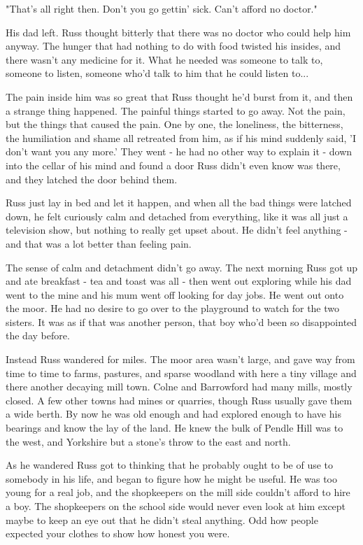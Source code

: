 \documentclass[a4paper,11pt]{article}
\begin{document}
"That's all right then. Don't you go gettin' sick. Can't afford no doctor."

His dad left. Russ thought bitterly that there was no doctor who could help him anyway. The hunger that had nothing to do with food twisted his insides, and there wasn't any medicine for it. What he needed was someone to talk to, someone to listen, someone who'd talk to him that he could listen to...

The pain inside him was so great that Russ thought he'd burst from it, and then a strange thing happened. The painful things started to go away. Not the pain, but the things that caused the pain. One by one, the loneliness, the bitterness, the humiliation and shame all retreated from him, as if his mind suddenly said, 'I don't want you any more.' They went - he had no other way to explain it - down into the cellar of his mind and found a door Russ didn't even know was there, and they latched the door behind them.

Russ just lay in bed and let it happen, and when all the bad things were latched down, he felt curiously calm and detached from everything, like it was all just a television show, but nothing to really get upset about. He didn't feel anything - and that was a lot better than feeling pain.

The sense of calm and detachment didn't go away. The next morning Russ got up and ate breakfast - tea and toast was all - then went out exploring while his dad went to the mine and his mum went off looking for day jobs. He went out onto the moor. He had no desire to go over to the playground to watch for the two sisters. It was as if that was another person, that boy who'd been so disappointed the day before.

Instead Russ wandered for miles. The moor area wasn't large, and gave way from time to time to farms, pastures, and sparse woodland with here a tiny village and there another decaying mill town. Colne and Barrowford had many mills, mostly closed. A few other towns had mines or quarries, though Russ usually gave them a wide berth. By now he was old enough and had explored enough to have his bearings and know the lay of the land. He knew the bulk of Pendle Hill was to the west, and Yorkshire but a stone's throw to the east and north.

As he wandered Russ got to thinking that he probably ought to be of use to somebody in his life, and began to figure how he might be useful. He was too young for a real job, and the shopkeepers on the mill side couldn't afford to hire a boy. The shopkeepers on the school side would never even look at him except maybe to keep an eye out that he didn't steal anything. Odd how people expected your clothes to show how honest you were.
\end{document}
